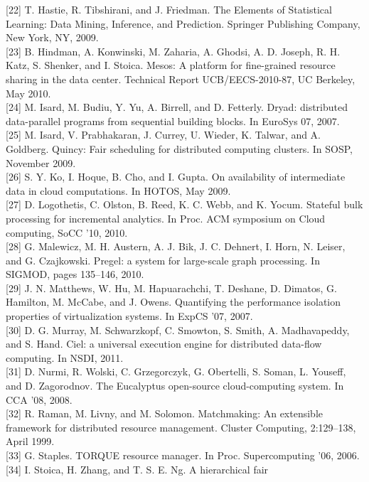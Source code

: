 \documentclass[
]{article}
\begin{document}
{[}22{]} T. Hastie, R. Tibshirani, and J. Friedman. The Elements of
Statistical Learning: Data Mining, Inference, and Prediction. Springer
Publishing Company, New York, NY, 2009.\\
{[}23{]} B. Hindman, A. Konwinski, M. Zaharia, A. Ghodsi, A. D. Joseph,
R. H. Katz, S. Shenker, and I. Stoica. Mesos: A platform for
fine-grained resource sharing in the data center. Technical Report
UCB/EECS-2010-87, UC Berkeley, May 2010.\\
{[}24{]} M. Isard, M. Budiu, Y. Yu, A. Birrell, and D. Fetterly. Dryad:
distributed data-parallel programs from sequential building blocks. In
EuroSys 07, 2007.\\
{[}25{]} M. Isard, V. Prabhakaran, J. Currey, U. Wieder, K. Talwar, and
A. Goldberg. Quincy: Fair scheduling for distributed computing clusters.
In SOSP, November 2009.\\
{[}26{]} S. Y. Ko, I. Hoque, B. Cho, and I. Gupta. On availability of
intermediate data in cloud computations. In HOTOS, May 2009.\\
{[}27{]} D. Logothetis, C. Olston, B. Reed, K. C. Webb, and K. Yocum.
Stateful bulk processing for incremental analytics. In Proc. ACM
symposium on Cloud computing, SoCC '10, 2010.\\
{[}28{]} G. Malewicz, M. H. Austern, A. J. Bik, J. C. Dehnert, I. Horn,
N. Leiser, and G. Czajkowski. Pregel: a system for large-scale graph
processing. In SIGMOD, pages 135--146, 2010.\\
{[}29{]} J. N. Matthews, W. Hu, M. Hapuarachchi, T. Deshane, D. Dimatos,
G. Hamilton, M. McCabe, and J. Owens. Quantifying the performance
isolation properties of virtualization systems. In ExpCS '07, 2007.\\
{[}30{]} D. G. Murray, M. Schwarzkopf, C. Smowton, S. Smith, A.
Madhavapeddy, and S. Hand. Ciel: a universal execution engine for
distributed data-flow computing. In NSDI, 2011.\\
{[}31{]} D. Nurmi, R. Wolski, C. Grzegorczyk, G. Obertelli, S. Soman, L.
Youseff, and D. Zagorodnov. The Eucalyptus open-source cloud-computing
system. In CCA '08, 2008.\\
{[}32{]} R. Raman, M. Livny, and M. Solomon. Matchmaking: An extensible
framework for distributed resource management. Cluster Computing,
2:129--138, April 1999.\\
{[}33{]} G. Staples. TORQUE resource manager. In Proc. Supercomputing
'06, 2006.\\
{[}34{]} I. Stoica, H. Zhang, and T. S. E. Ng. A hierarchical fair
\end{document}
